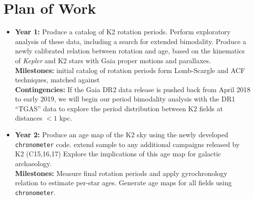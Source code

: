 \documentclass[12pt]{article}
\newcommand{\Kepler}{\textsl{Kepler}\xspace}
\begin{document}
\section{Plan of Work}



\begin{itemize}
\item {\bf Year 1:} Produce a catalog of K2 rotation periods. Perform exploratory
analysis of these data, including a search for extended bimodality.
Produce a newly calibrated relation between rotation and age,
based on the kinematics of \Kepler and K2 stars with Gaia proper motions and
parallaxes.
\\
{\bf Milestones:} initial catalog of rotation periods form Lomb-Scargle and ACF techniques, matched against 
\\
{\bf Contingencies:} If the Gaia DR2 data release is pushed back from April 2018 to early 2019, we will begin our period bimodality analysis with the DR1 ``TGAS'' data to explore the period distribution between K2 fields at distances $< 1$ kpc.
\item {\bf Year 2:} Produce an age map of the K2 sky using the newly developed 
{\tt chronometer} code. extend sample to any additional campaigns released by K2 (C15,16,17)
Explore the implications of this age map for galactic archaeology.
\\
{\bf Milestones:} Measure final rotation periods and apply gyrochronology relation to estimate per-star ages. Generate age maps for all fields using {\tt chronometer}.
\end{itemize}

\clearpage


\end{document}
